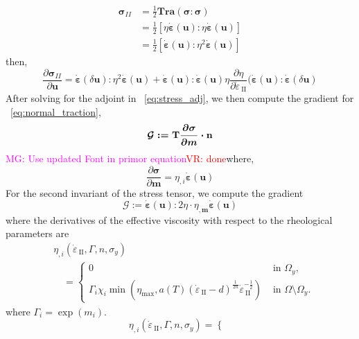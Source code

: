\documentclass[12pt]{article}
\newcommand{\mgnote}[1]{\textcolor{magenta}{MG: #1}}
\newcommand{\vrnote}[1]{\textcolor{red}{VR: #1}}
\newcommand{\IIinv}{{\dot\varepsilon}_{\mathrm{\!\!\:II}}}
\newcommand{\mm}{{\ensuremath{\boldsymbol{m}}}}
\newcommand{\uu}{{\ensuremath{\boldsymbol{u}}}}
\newcommand{\ssigma}{{\ensuremath{\boldsymbol{\sigma}}}}
\newcommand{\strain}{{\ensuremath{\dot{\boldsymbol{\varepsilon}}}}}
\begin{document}
{\begin{equation}
  \begin{split}
 \ssigma_{II}& = \frac{1}{2}\textbf{Tra}(\ssigma:\ssigma) \\
 & = \frac{1}{2}[\eta\strain(\uu):\eta\strain(\uu)]\\
             & = \frac{1}{2}[\strain(\uu):\eta^2\strain(\uu)]
\end{split}
\end{equation}
then,
\begin{equation}
    \frac{\partial \ssigma_{II}}{\partial \uu} = \strain(\delta \uu):\eta^2\strain(\uu) +
 \strain(\uu):\strain(\uu)\eta\frac{\partial\eta}{\partial \IIinv}(\strain(\uu):\strain(\delta\uu)
\label{eq:stress_adj}
\end{equation}
After solving for the adjoint in ~\eqref{eq:stress_adj}, we then compute the gradient for ~\eqref{eq:normal_traction},
\begin{equation}
\mathcal{G}:=  \boldmath{\mathrm{T}}\frac{\partial{\ssigma}}{{\partial \mm}}\cdot \textbf{n}
\end{equation}
\mgnote{Use updated Font in primor equation}\vrnote{done}where,
\begin{equation}
\frac{\partial \ssigma}{\partial \mm} = \eta_{,i}\strain(\uu)
\end{equation}
For the second invariant of the stress tensor, we compute the gradient
\begin{equation}
\mathcal G:=  \strain(\uu):2\eta\cdot\eta_{,\mm}\strain(\uu)
\label{eq:grad_iie}
\end{equation}
where the derivatives of the effective viscosity with respect to the rheological parameters are
\begin{align*}
  &\eta_{,i}(\IIinv,\Gamma,n,\sigma_y) \\
  &\quad=\begin{cases}
    0 & \text{ in } \Omega_y,\\
    \Gamma_i\chi_i\min(\eta_{\max},a(T)(\IIinv-d)^{\frac{1}{2n}}\IIinv^{-\frac{1}{2}})
    & \text{ in } \Omega\setminus\Omega_y.
  \end{cases}
\end{align*}
where $\Gamma_i = \exp(m_i)$.
\begin{equation*}
  \eta_{,i}(\IIinv,\Gamma,n,\sigma_y) =
  \begin{cases}

\end{cases}
\end{equation*}}
\end{document}
